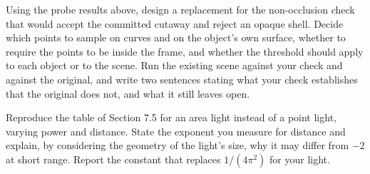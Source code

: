 \begin{exercise}
Using the probe results above, design a replacement for the non-occlusion check that would accept the committed cutaway and reject an opaque shell. Decide which points to sample on curves and on the object's own surface, whether to require the points to be inside the frame, and whether the threshold should apply to each object or to the scene. Run the existing scene against your check and against the original, and write two sentences stating what your check establishes that the original does not, and what it still leaves open.
\end{exercise}

\begin{exercise}
Reproduce the table of Section 7.5 for an area light instead of a point light, varying power and distance. State the exponent you measure for distance and explain, by considering the geometry of the light's size, why it may differ from $-2$ at short range. Report the constant that replaces $1/(4\pi^2)$ for your light.
\end{exercise}
